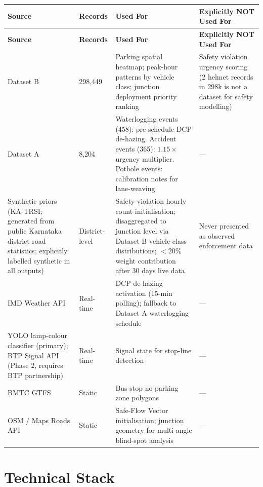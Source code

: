 \documentclass[11pt,a4paper]{article}
\begin{document}
\begin{longtable}{L{3cm} C{1.8cm} L{4.5cm} L{5cm}}
    \toprule
    \color{white}\textbf{Source} & \color{white}\textbf{Records} & \color{white}\textbf{Used For} & \color{white}\textbf{Explicitly NOT Used For} \\
    \midrule
    \endfirsthead
    \toprule
    \color{white}\textbf{Source} & \color{white}\textbf{Records} & \color{white}\textbf{Used For} & \color{white}\textbf{Explicitly NOT Used For} \\
    \midrule
    \endhead
    \bottomrule
    \endfoot

    Dataset B & 298,449 & Parking spatial heatmap; peak-hour patterns by vehicle class; junction deployment priority ranking & Safety violation urgency scoring (2 helmet records in 298k is not a dataset for safety modelling) \\
    Dataset A & 8,204 & Waterlogging events (458): pre-schedule DCP de-hazing. Accident events (365): $1.15\times$ urgency multiplier. Pothole events: calibration notes for lane-weaving & --- \\
    Synthetic priors (KA-TRSI; generated from public Karnataka district road statistics; explicitly labelled synthetic in all outputs) & District-level & Safety-violation hourly count initialisation; disaggregated to junction level via Dataset B vehicle-class distributions; $<20\%$ weight contribution after 30 days live data & Never presented as observed enforcement data \\
    IMD Weather API & Real-time & DCP de-hazing activation (15-min polling); fallback to Dataset A waterlogging schedule & --- \\
    YOLO lamp-colour classifier (primary); BTP Signal API (Phase 2, requires BTP partnership) & Real-time & Signal state for stop-line detection & --- \\
    BMTC GTFS & Static & Bus-stop no-parking zone polygons & --- \\
    OSM / Maps Roads API & Static & Safe-Flow Vector initialisation; junction geometry for multi-angle blind-spot analysis & --- \\
\end{longtable}

\section{Technical Stack}
\end{document}
